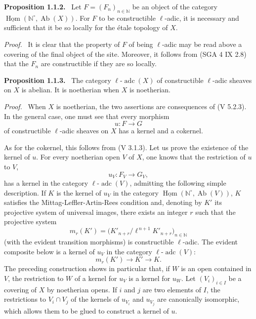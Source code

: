 \documentclass[11pt]{article}
\providecommand{\uHom}{\underline{\Hom}}
\newenvironment{statement}[1]{\par\medskip\noindent\textbf{#1.}\ }{\par\medskip}
\newenvironment{prooftext}[1][Proof]{\par\noindent\emph{#1.}\ }{\par\medskip}
\DeclareMathOperator{\Hom}{Hom}
\providecommand{\Hom}{\operatorname{Hom}}
\providecommand{\Ab}{\operatorname{Ab}}
\providecommand{\adc}{\operatorname{adc}}
\providecommand{\Ab}{\operatorname{Ab}}
\providecommand{\Hom}{\operatorname{Hom}}
\begin{document}
\begin{statement}{Proposition 1.1.2}
Let \(F=(F_n)_{n\in\mathbb N}\) be an object of the category \(\uHom(\mathbb N^\circ,\Ab(X))\). For \(F\) to be constructible \(\ell\)-adic, it is necessary and sufficient that it be so locally for the étale topology of \(X\).
\end{statement}

\begin{prooftext}[Proof]
It is clear that the property of \(F\) of being \(\ell\)-adic may be read above a covering of the final object of the site. Moreover, it follows from (SGA 4 IX 2.8) that the \(F_n\) are constructible if they are so locally.
\end{prooftext}

\begin{statement}{Proposition 1.1.3}
The category \(\ell\text{-}\adc(X)\) of constructible \(\ell\)-adic sheaves on \(X\) is abelian. It is noetherian when \(X\) is noetherian.
\end{statement}

\begin{prooftext}[Proof]
When \(X\) is noetherian, the two assertions are consequences of (V 5.2.3). In the general case, one must see that every morphism
\[
u:F\longrightarrow G
\]
of constructible \(\ell\)-adic sheaves on \(X\) has a kernel and a cokernel.

As for the cokernel, this follows from (V 3.1.3). Let us prove the existence of the kernel of \(u\). For every noetherian open \(V\) of \(X\), one knows that the restriction of \(u\) to \(V\),
\[
u_V:F_V\longrightarrow G_V,
\]
has a kernel in the category \(\ell\text{-}\adc(V)\), admitting the following simple description. If \(K\) is the kernel of \(u_V\) in the category \(\uHom(\mathbb N^\circ,\Ab(V))\), \(K\) satisfies the Mittag-Leffler-Artin-Rees condition and, denoting by \(K'\) its projective system of universal images, there exists an integer \(r\) such that the projective system
\[
m_r(K')=\bigl(K'_{n+r}/\ell^{\,n+1}K'_{n+r}\bigr)_{n\in\mathbb N}
\]
(with the evident transition morphisms) is constructible \(\ell\)-adic. The evident composite below is a kernel of \(u_V\) in the category \(\ell\text{-}\adc(V)\):
\[
m_r(K')\longrightarrow K'\longrightarrow K.
\]
The preceding construction shows in particular that, if \(W\) is an open contained in \(V\), the restriction to \(W\) of a kernel for \(u_V\) is a kernel for \(u_W\). Let \((V_i)_{i\in I}\) be a covering of \(X\) by noetherian opens. If \(i\) and \(j\) are two elements of \(I\), the restrictions to \(V_i\cap V_j\) of the kernels of \(u_{V_i}\) and \(u_{V_j}\) are canonically isomorphic, which allows them to be glued to construct a kernel of \(u\).
\end{prooftext}
\end{document}
